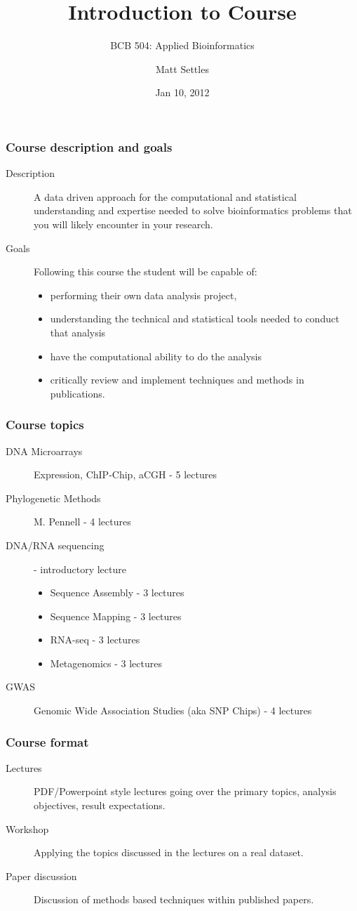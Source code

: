 \documentclass[pdf]{beamer}
\title[Course Introduction]{Introduction to Course\\}
\subtitle{BCB 504: Applied Bioinformatics\\}
\author[Matt Settles]{Matt Settles}
\institute{University of Idaho\\ Bioinformatics and Computational Biology Program}
\date{Jan 10, 2012}
\begin{document}
\begin{frame}
\titlepage
\end{frame}


\begin{frame}
	\frametitle{Course description and goals}
	\begin{description}
	\item[Description]
	A data driven approach for the computational and statistical understanding and expertise needed to solve bioinformatics problems that you will likely encounter in your research. 
	\item[Goals]
	Following this course the student will be capable of:
	\begin{itemize} 
		\item performing their own data analysis project, 
		\item understanding the technical and statistical tools needed to conduct that analysis
		\item have the computational ability to do the analysis
		\item critically review and implement techniques and methods in publications.
	\end{itemize}
	\end{description}
\end{frame}

\begin{frame}
	\frametitle{Course topics}
	\begin{description}
		\item[DNA Microarrays] Expression, ChIP-Chip, aCGH - 5 lectures
		\item[Phylogenetic Methods] M. Pennell - 4 lectures
		\item[DNA/RNA sequencing] - introductory lecture 
		\begin{itemize}
			\item Sequence Assembly - 3 lectures
			\item Sequence Mapping - 3 lectures
			\item RNA-seq - 3 lectures
			\item Metagenomics - 3 lectures
		\end{itemize}
		\item[GWAS] Genomic Wide Association Studies (aka SNP Chips) - 4 lectures
	\end{description}
\end{frame}

\begin{frame}
	\frametitle{Course format}
	\begin{description}
		\item[Lectures] PDF/Powerpoint style lectures going over the primary topics, analysis objectives, result expectations.
		\item[Workshop] Applying the topics discussed in the lectures on a real dataset.
		\item[Paper discussion] Discussion of methods based techniques within published papers.
	\end{description}
\end{frame}	
\end{document}
